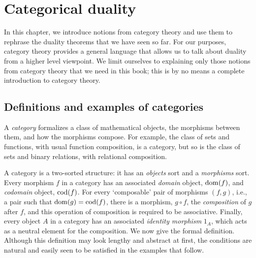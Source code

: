 \chapter{Categorical duality}\label{ch:categories}
In this chapter, we introduce notions from category theory and use them to rephrase the duality theorems that we have seen so far. For our purposes, category theory provides a general language that allows us to talk about duality from a higher level viewpoint. We limit ourselves to explaining only those notions from category theory that we need in this book; this is by no means a complete introduction to category theory. 

 

\section{Definitions and examples of categories}\label{sec:categorydef}
A \emph{category} formalizes a class of mathematical objects, the morphisms between them, and how the morphisms compose. For example, the class of sets and functions, with usual function composition, is a category, but so is the class of sets and binary relations, with relational composition. 


A category is a two-sorted structure: it has an \emph{objects} sort and a \emph{morphisms} sort. Every morphism $f$ in a category has an associated \emph{domain} object, $\operatorname{\mathrm{dom}}(f)$, and \emph{codomain} object, $\operatorname{\mathrm{cod}}(f)$. For every `composable' pair of morphisms $(f,g)$, i.e., a pair such that $\operatorname{\mathrm{dom}}(g) = \operatorname{\mathrm{cod}}(f)$, there is a morphism, $g \circ f$, the \emph{composition} of $g$ after $f$, and this operation of composition is required to be associative. Finally, every object $A$ in a category has an associated \emph{identity morphism} $1_A$, which acts as a neutral element for the composition. We now give the formal definition. Although this definition may look lengthy and abstract at first, the conditions are natural and easily seen to be satisfied in the examples that follow.

